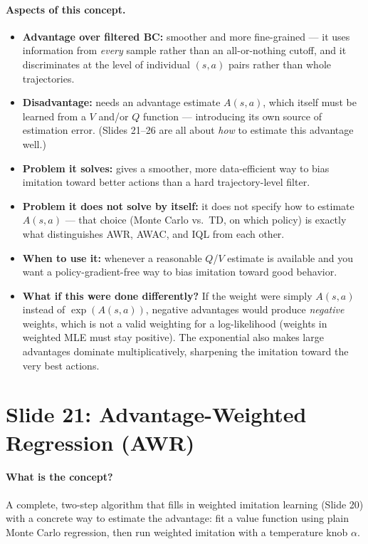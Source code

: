 \documentclass[11pt]{article}
\begin{document}
\paragraph{Aspects of this concept.}
\begin{itemize}
\item \textbf{Advantage over filtered BC:} smoother and more fine-grained --- it uses
information from \emph{every} sample rather than an all-or-nothing cutoff, and it
discriminates at the level of individual $(s,a)$ pairs rather than whole trajectories.
\item \textbf{Disadvantage:} needs an advantage estimate $A(s,a)$, which itself must be
learned from a $V$ and/or $Q$ function --- introducing its own source of estimation
error. (Slides 21--26 are all about \emph{how} to estimate this advantage well.)
\item \textbf{Problem it solves:} gives a smoother, more data-efficient way to bias
imitation toward better actions than a hard trajectory-level filter.
\item \textbf{Problem it does not solve by itself:} it does not specify how to estimate
$A(s,a)$ --- that choice (Monte Carlo vs.\ TD, on which policy) is exactly what
distinguishes AWR, AWAC, and IQL from each other.
\item \textbf{When to use it:} whenever a reasonable $Q$/$V$ estimate is available and
you want a policy-gradient-free way to bias imitation toward good behavior.
\item \textbf{What if this were done differently?} If the weight were simply $A(s,a)$
instead of $\exp(A(s,a))$, negative advantages would produce \emph{negative} weights,
which is not a valid weighting for a log-likelihood (weights in weighted MLE must stay
positive). The exponential also makes large advantages dominate multiplicatively,
sharpening the imitation toward the very best actions.
\end{itemize}

\section{Slide 21: Advantage-Weighted Regression (AWR)}

\paragraph{What is the concept?}
A complete, two-step algorithm that fills in weighted imitation learning (Slide 20) with
a concrete way to estimate the advantage: fit a value function using plain Monte Carlo
regression, then run weighted imitation with a temperature knob $\alpha$.
\end{document}
